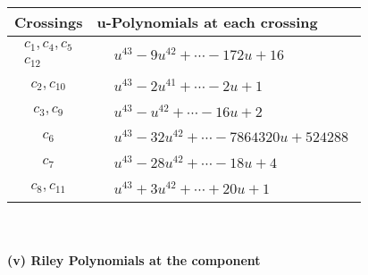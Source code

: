 \documentclass[1p]{elsarticle_modified}
\theoremstyle{definition}
\begin{document}
\begin{tabular}{m{50pt}|m{274pt}}
Crossings & \hspace{64pt}u-Polynomials at each crossing \\
\hline $$\begin{aligned}c_{1},c_{4},c_{5}\\c_{12}\end{aligned}$$&$\begin{aligned}
&u^{43}-9 u^{42}+\cdots-172 u+16
\end{aligned}$\\
\hline $$\begin{aligned}c_{2},c_{10}\end{aligned}$$&$\begin{aligned}
&u^{43}-2 u^{41}+\cdots-2 u+1
\end{aligned}$\\
\hline $$\begin{aligned}c_{3},c_{9}\end{aligned}$$&$\begin{aligned}
&u^{43}- u^{42}+\cdots-16 u+2
\end{aligned}$\\
\hline $$\begin{aligned}c_{6}\end{aligned}$$&$\begin{aligned}
&u^{43}-32 u^{42}+\cdots-7864320 u+524288
\end{aligned}$\\
\hline $$\begin{aligned}c_{7}\end{aligned}$$&$\begin{aligned}
&u^{43}-28 u^{42}+\cdots-18 u+4
\end{aligned}$\\
\hline $$\begin{aligned}c_{8},c_{11}\end{aligned}$$&$\begin{aligned}
&u^{43}+3 u^{42}+\cdots+20 u+1
\end{aligned}$\\
\hline
\end{tabular}\\~\\
\newpage\renewcommand{\arraystretch}{1}
\flushleft \textbf{(v) Riley Polynomials at the component}\newline \\
\end{document}
